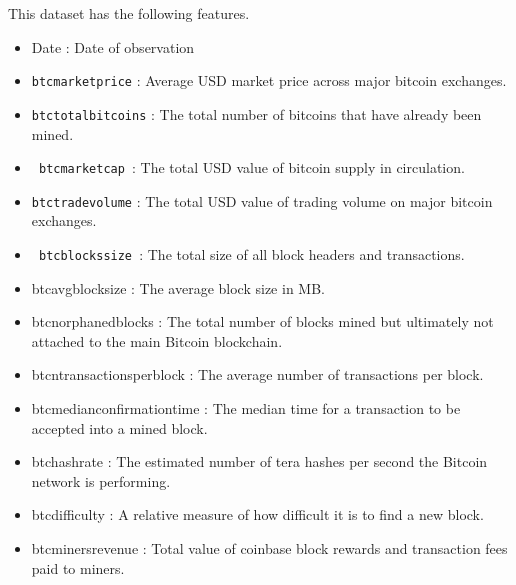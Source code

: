 \documentclass{article}
\begin{document}
This dataset has the following features.
\begin{itemize}
\item Date : Date of observation

\item \texttt {btc\textunderscore market\textunderscore price} : Average USD market price across major bitcoin exchanges.

\item \texttt {btc\textunderscore total\textunderscore bitcoins} : The total number of bitcoins that have already been mined.

\item \texttt { btc\textunderscore market\textunderscore cap }: The total USD value of bitcoin supply in circulation.

\item \texttt {btc\textunderscore trade\textunderscore volume} : The total USD value of trading volume on major bitcoin exchanges.

\item \texttt{ btc\textunderscore blocks\textunderscore size }: The total size of all block headers and transactions.

\item btc\textunderscore avg\textunderscore block\textunderscore size : The average block size in MB.

\item btc\textunderscore n\textunderscore orphaned\textunderscore blocks : The total number of blocks mined but ultimately not attached to the main Bitcoin blockchain.

\item btc\textunderscore n\textunderscore transactions\textunderscore per\textunderscore block : The average number of transactions per block.

\item btc\textunderscore median\textunderscore confirmation\textunderscore time : The median time for a transaction to be accepted into a mined block.

\item btc\textunderscore hash\textunderscore rate : The estimated number of tera hashes per second the Bitcoin network is performing.

\item btc\textunderscore difficulty : A relative measure of how difficult it is to find a new block.

\item btc\textunderscore miners\textunderscore revenue : Total value of coinbase block rewards and transaction fees paid to miners.


\end{itemize}
\end{document}
